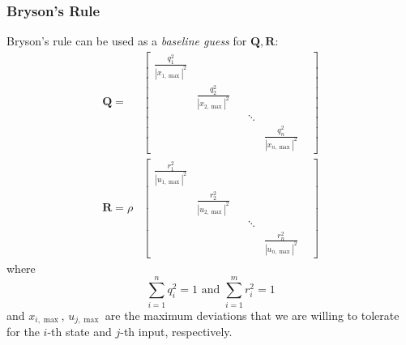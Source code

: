 \subsubsection{Bryson's Rule}
Bryson's rule can be used as a \textit{baseline guess} for $\mathbf{Q,R}$:
\noindent\begin{align*}
    \mathbf{Q} =
     & \begin{bmatrix}\frac{q_1^2}{|x_{1,\max}|^2} &                              &  &        &                              & \\
                                            & \frac{q_2^2}{|x_{2,\max}|^2} &  &        &                              & \\
                                            &                              &  & \ddots &                              & \\
                                            &                              &  &        & \frac{q_n^2}{|x_{n,\max}|^2}
       \end{bmatrix} \\
    \mathbf{R} = \rho
     & \begin{bmatrix}\frac{r_1^2}{|u_{1,\max}|^2} &                              &  &        &                              & \\
                                            & \frac{r_2^2}{|u_{2,\max}|^2} &  &        &                              & \\
                                            &                              &  & \ddots &                              & \\
                                            &                              &  &        & \frac{r_n^2}{|u_{n,\max}|^2}
       \end{bmatrix}
\end{align*}
where
\noindent\begin{equation*}
    \sum_{i=1}^n q_i^2=1\text{ and }\sum_{i=1}^m r_i^2=1
\end{equation*}
and $x_{i,\max}$, $u_{j,\max}$ are the maximum deviations that we are willing to tolerate for the $i$-th state and $j$-th input, respectively.

